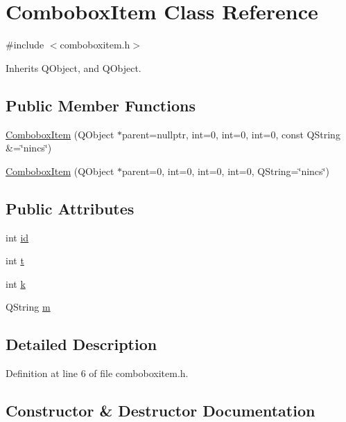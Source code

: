\hypertarget{classComboboxItem}{}\section{Combobox\+Item Class Reference}
\label{classComboboxItem}


{\ttfamily \#include $<$comboboxitem.\+h$>$}



Inherits Q\+Object, and Q\+Object.

\subsection*{Public Member Functions}
\begin{DoxyCompactItemize}
\item 
\hyperlink{classComboboxItem_a1a7c361fa2b24b605e4b556c29929c20}{Combobox\+Item} (Q\+Object $\ast$parent=nullptr, int=0, int=0, int=0, const Q\+String \&=\char`\"{}nincs\char`\"{})
\item 
\hyperlink{classComboboxItem_ae3518d9f36610c9693b680b3d3f45681}{Combobox\+Item} (Q\+Object $\ast$parent=0, int=0, int=0, int=0, Q\+String=\char`\"{}nincs\char`\"{})
\end{DoxyCompactItemize}
\subsection*{Public Attributes}
\begin{DoxyCompactItemize}
\item 
int \hyperlink{classComboboxItem_af3201016f4c607111881691f44d10d4f}{id}
\item 
int \hyperlink{classComboboxItem_ab16f8c38febd0f7f3a0ba647acfa4d45}{t}
\item 
int \hyperlink{classComboboxItem_adecde5389a40dc89b0f83a8936c3635f}{k}
\item 
Q\+String \hyperlink{classComboboxItem_a515e46e92e92c520e7d1b38f168b7126}{m}
\end{DoxyCompactItemize}


\subsection{Detailed Description}


Definition at line 6 of file comboboxitem.\+h.



\subsection{Constructor \& Destructor Documentation}
\mbox{\label{classComboboxItem_a1a7c361fa2b24b605e4b556c29929c20}} 
